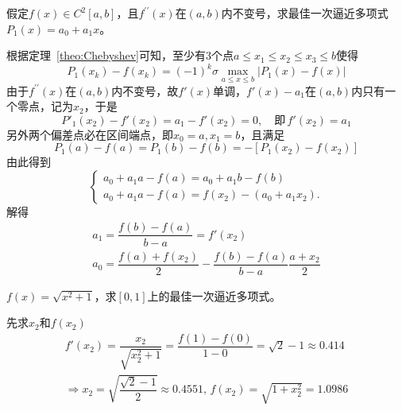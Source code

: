 \begin{example}
    假定$f(x)\in C^{2}[a,b]$，且$f^{\prime\prime}(x)$在$(a,b)$内不变号，求最佳一次逼近多项式$P_1(x) = a_0+a_1x$。
    \begin{solution}
        根据定理~\ref{theo:Chebyshev}可知，至少有3个点$a\leqslant x_1\leqslant x_2\leqslant x_3\leqslant b$使得
        \[
            P_{1}(x_k)-f(x_k) = (-1)^{k}\sigma\max\limits_{a\leqslant x\leqslant b}|P_{1}(x)-f(x)|
        \]
        由于$f^{\prime\prime}(x)$在$(a,b)$内不变号，故$f'(x)$单调，$f'(x)-a_1$在$(a,b)$内只有一个零点，记为$x_2$，于是
        \[
            P'_{1}(x_2)-f'(x_2) = a_1-f'(x_2) = 0,\quad\text{即}\,f'(x_2) = a_1
        \]
        \colorbox{red!50}{另外两个偏差点必在区间端点}，即$x_0 = a,x_1  =b$，且满足
        \[
            P_{1}(a)-f(a) = P_{1}(b)-f(b) = -[P_{1}(x_2)-f(x_2)]
        \]
        由此得到
        \[
            \left\{
                \begin{array}{l}
                    a_0+a_1a-f(a)=a_0+a_1b-f(b)\\
                    a_0+a_1a-f(a)=f(x_2)-(a_0+a_1x_2).
                \end{array}
            \right.
        \]
        解得
        \[
            \begin{array}{l}
                a_1 = \dfrac{f(b)-f(a)}{b-a} = f'(x_2)\\
                a_0 = \dfrac{f(a)+f(x_2)}{2}-\dfrac{f(b)-f(a)}{b-a}\dfrac{a+x_2}{2}
            \end{array}
        \]
    \end{solution}
\end{example}
\begin{example}
    $f(x) = \sqrt{x^2+1}$，求$[0,1]$上的最佳一次逼近多项式。
    
    \begin{solution}
        先求$x_2$和$f(x_2)$
        \[
            \begin{array}{l}
                f'(x_2) = \dfrac{x_2}{\sqrt{x_2^2+1}} = \dfrac{f(1)-f(0)}{1-0} = \sqrt{2}-1\approx 0.414\\
                \Rightarrow x_2  = \sqrt{\dfrac{\sqrt{2}-1}{2}}\approx 0.4551,\,f(x_2) = \sqrt{1+x_2^2} = 1.0986
            \end{array}
        \]
    \end{solution}
\end{example}
